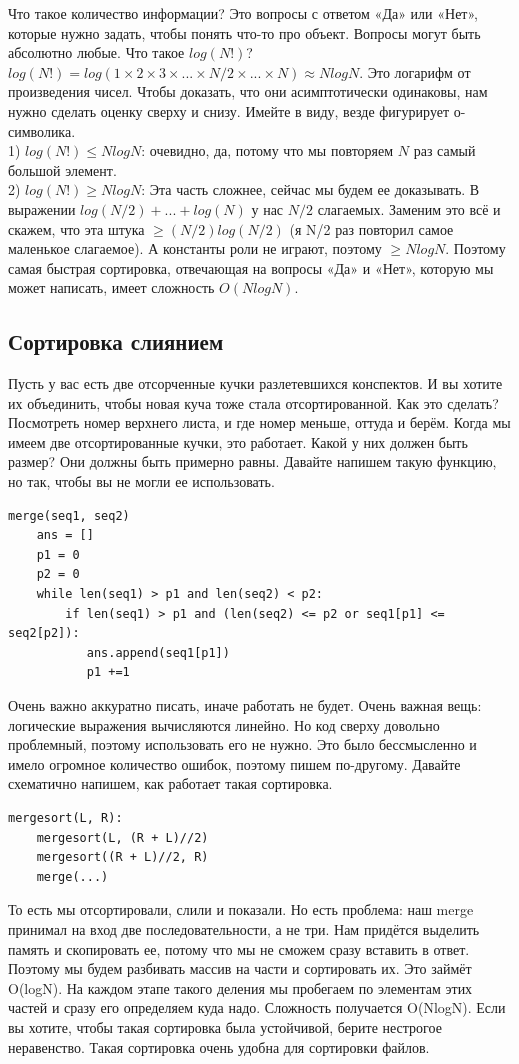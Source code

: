 \documentclass[12pt]{article}
\begin{document}
Что такое количество информации? Это вопросы с ответом «Да» или «Нет», которые нужно задать, чтобы понять что-то про объект. Вопросы могут быть абсолютно любые. 
Что такое $log(N!)$? $log(N!) = log(1 \times 2 \times 3 \times ... \times N/2 \times ... \times N) \approx NlogN$. Это логарифм от произведения чисел. Чтобы доказать, что они асимптотически одинаковы, нам нужно сделать оценку сверху и снизу. Имейте в виду, везде фигурирует о-символика.\\
1) $log(N!) \leq NlogN$: очевидно, да, потому что мы повторяем $N$ раз самый большой элемент.\\
2) $log(N!) \geq NlogN$: Эта часть сложнее, сейчас мы будем ее доказывать. В выражении $log(N/2) + ... + log(N)$ у нас $N/2$ слагаемых. Заменим это всё и скажем, что эта штука $\geq (N/2)log(N/2)$ (я N/2 раз повторил самое маленькое слагаемое). А константы роли не играют, поэтому $\geq NlogN$. Поэтому самая быстрая сортировка, отвечающая на вопросы «Да» и «Нет», которую мы может написать, имеет сложность $O(NlogN)$.

\subsection*{Сортировка слиянием}
Пусть у вас есть две отсорченные кучки разлетевшихся конспектов. И вы хотите их объединить, чтобы новая куча тоже стала отсортированной. Как это сделать? Посмотреть номер верхнего листа, и где номер меньше, оттуда и берём. Когда мы имеем две отсортированные кучки, это работает. Какой у них должен быть размер? Они должны быть примерно равны. Давайте напишем такую функцию, но так, чтобы вы не могли ее использовать. 
\begin{verbatim}
merge(seq1, seq2)
    ans = []
    p1 = 0
    p2 = 0
    while len(seq1) > p1 and len(seq2) < p2:
        if len(seq1) > p1 and (len(seq2) <= p2 or seq1[p1] <= seq2[p2]):
           ans.append(seq1[p1])
           p1 +=1
\end{verbatim}
Очень важно аккуратно писать, иначе работать не будет. Очень важная вещь: логические выражения вычисляются линейно. Но код сверху довольно проблемный, поэтому использовать его не нужно. Это было бессмысленно и имело огромное количество ошибок, поэтому пишем по-другому. Давайте схематично напишем, как работает такая сортировка.
\begin{verbatim}
mergesort(L, R):
    mergesort(L, (R + L)//2)
    mergesort((R + L)//2, R)
    merge(...)
\end{verbatim}
То есть мы отсортировали, слили и показали. Но есть проблема: наш merge принимал на вход две последовательности, а не три. Нам придётся выделить память и скопировать ее, потому что мы не сможем сразу вставить в ответ. Поэтому мы будем разбивать массив на части и сортировать их. Это займёт O(logN). На каждом этапе такого деления мы пробегаем по элементам этих частей и сразу его определяем куда надо. Сложность получается O(NlogN). Если вы хотите, чтобы такая сортировка была устойчивой, берите нестрогое неравенство. Такая сортировка очень удобна для сортировки файлов.
\end{document}
